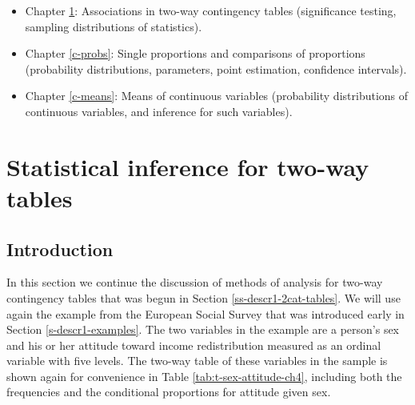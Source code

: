 \documentclass[11pt,a4paper,openany]{book}
\begin{document}
\begin{itemize}
\item
  Chapter \ref{c-tables}: Associations in two-way contingency tables
  (significance testing, sampling distributions of statistics).
\item
  Chapter \ref{c-probs}: Single proportions and comparisons of
  proportions (probability distributions, parameters, point estimation,
  confidence intervals).
\item
  Chapter \ref{c-means}: Means of continuous variables (probability
  distributions of continuous variables, and inference for such
  variables).
\end{itemize}

\chapter{Statistical inference for two-way tables}\label{c-tables}

\section{Introduction}\label{s-tables-intro}

In this section we continue the discussion of methods of analysis for
two-way contingency tables that was begun in Section
\ref{ss-descr1-2cat-tables}. We will use again the example from the
European Social Survey that was introduced early in Section
\ref{s-descr1-examples}. The two variables in the example are a person's
sex and his or her attitude toward income redistribution measured as an
ordinal variable with five levels. The two-way table of these variables
in the sample is shown again for convenience in Table
\ref{tab:t-sex-attitude-ch4}, including both the frequencies and the
conditional proportions for attitude given sex.
\end{document}
